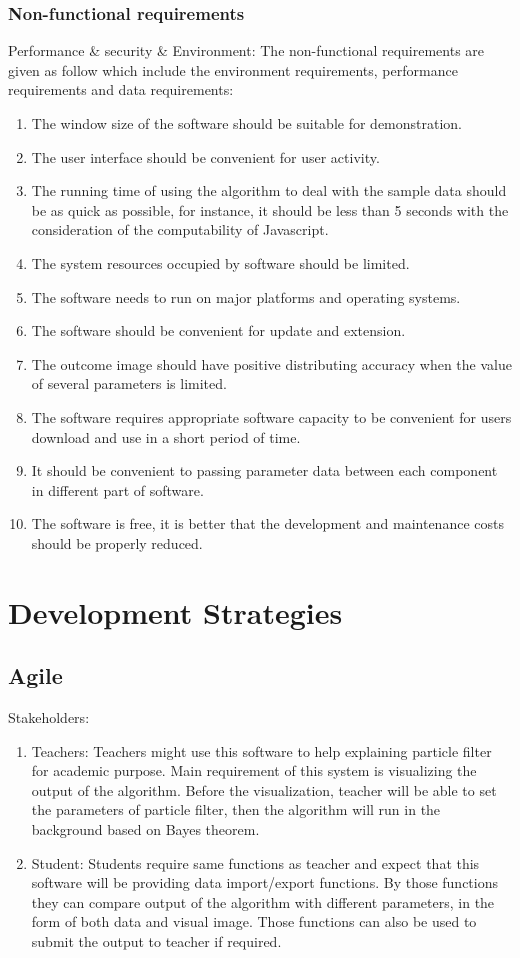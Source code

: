\documentclass[11pt,oneside,a4paper]{article}
\begin{document}
\subsubsection{Non-functional requirements}
Performance \& security \& Environment:
The non-functional requirements are given as follow which include the environment requirements, performance requirements and data requirements:
\begin{enumerate}
  \item The window size of the software should be suitable for demonstration.
  \item The user interface should be convenient for user activity.
  \item The running time of using the algorithm to deal with the sample data should be as quick as possible, for instance, it should be less than 5 seconds with the consideration of the computability of Javascript.
  \item The system resources occupied by software should be limited.
  \item The software needs to run on major platforms and operating systems.
  \item The software should be convenient for update and extension.
  \item The outcome image should have positive distributing accuracy when the value of several parameters is limited.
  \item The software requires appropriate software capacity to be convenient for users download and use in a short period of time.
  \item It should be convenient to passing parameter data between each component in different part of software.
  \item The software is free, it is better that the development and maintenance costs should be properly reduced.
\end{enumerate}

\section{Development Strategies}
\subsection{Agile}
Stakeholders:
\begin{enumerate}
  \item Teachers: Teachers might use this software to help explaining particle filter for academic purpose. Main requirement of this system is visualizing the output of the algorithm. Before the visualization, teacher will be able to set the parameters of particle filter, then the algorithm will run in the background based on Bayes theorem.
  \item Student: Students require same functions as teacher and expect that this software will be providing data import/export functions. By those functions they can compare output of the algorithm with different parameters, in the form of both data and visual image. Those functions can also be used to submit the output to teacher if required.

\end{enumerate}
\end{document}
